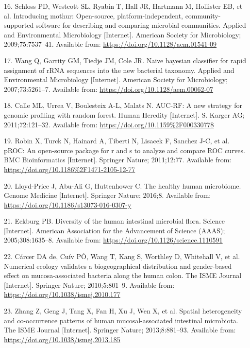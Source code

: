 \documentclass[12pt,]{article}
\begin{document}
\hypertarget{ref-Schloss2009}{}
16. Schloss PD, Westcott SL, Ryabin T, Hall JR, Hartmann M, Hollister
EB, et al. Introducing mothur: Open-source, platform-independent,
community-supported software for describing and comparing microbial
communities. Applied and Environmental Microbiology {[}Internet{]}.
American Society for Microbiology; 2009;75:7537--41. Available from:
\url{https://doi.org/10.1128/aem.01541-09}

\hypertarget{ref-Wang2007}{}
17. Wang Q, Garrity GM, Tiedje JM, Cole JR. Naive bayesian classifier
for rapid assignment of rRNA sequences into the new bacterial taxonomy.
Applied and Environmental Microbiology {[}Internet{]}. American Society
for Microbiology; 2007;73:5261--7. Available from:
\url{https://doi.org/10.1128/aem.00062-07}

\hypertarget{ref-Calle_2011}{}
18. Calle ML, Urrea V, Boulesteix A-L, Malats N. AUC-RF: A new strategy
for genomic profiling with random forest. Human Heredity {[}Internet{]}.
S. Karger AG; 2011;72:121--32. Available from:
\url{https://doi.org/10.1159\%2F000330778}

\hypertarget{ref-Robin_2011}{}
19. Robin X, Turck N, Hainard A, Tiberti N, Lisacek F, Sanchez J-C, et
al. pROC: An open-source package for r and s to analyze and compare ROC
curves. BMC Bioinformatics {[}Internet{]}. Springer Nature; 2011;12:77.
Available from: \url{https://doi.org/10.1186\%2F1471-2105-12-77}

\hypertarget{ref-LloydPrice2016}{}
20. Lloyd-Price J, Abu-Ali G, Huttenhower C. The healthy human
microbiome. Genome Medicine {[}Internet{]}. Springer Nature; 2016;8.
Available from: \url{https://doi.org/10.1186/s13073-016-0307-y}

\hypertarget{ref-Eckburg2005}{}
21. Eckburg PB. Diversity of the human intestinal microbial flora.
Science {[}Internet{]}. American Association for the Advancement of
Science (AAAS); 2005;308:1635--8. Available from:
\url{https://doi.org/10.1126/science.1110591}

\hypertarget{ref-deCarcer2010}{}
22. Cárcer DA de, Cuív PÓ, Wang T, Kang S, Worthley D, Whitehall V, et
al. Numerical ecology validates a biogeographical distribution and
gender-based effect on mucosa-associated bacteria along the human colon.
The ISME Journal {[}Internet{]}. Springer Nature; 2010;5:801--9.
Available from: \url{https://doi.org/10.1038/ismej.2010.177}

\hypertarget{ref-Zhang2013}{}
23. Zhang Z, Geng J, Tang X, Fan H, Xu J, Wen X, et al. Spatial
heterogeneity and co-occurrence patterns of human mucosal-associated
intestinal microbiota. The ISME Journal {[}Internet{]}. Springer Nature;
2013;8:881--93. Available from:
\url{https://doi.org/10.1038/ismej.2013.185}
\end{document}
